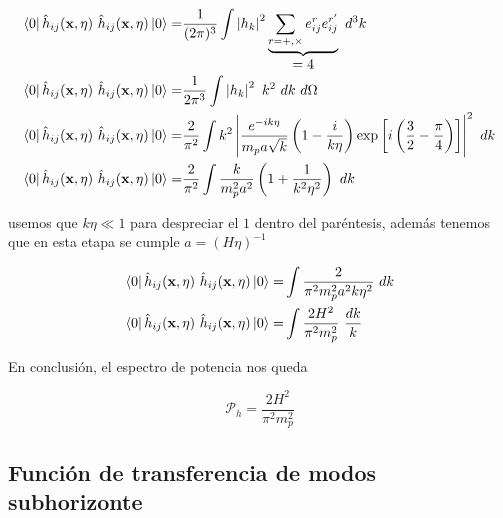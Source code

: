 \begin{equation*}
\begin{split}
        \bra{0} \hat{h}_{ij} (\textbf{x},\eta) \ \hat{h}_{ij} (\textbf{x}, \eta) \ket{0} =& \frac{1}{(2\pi)^3} \int \left| h_k \right|^2 \underbrace{\sum_{r = +, \times} e_{ij}^r e_{ij}^{r^\prime}}_{\displaystyle = 4} \ d^3 k\\
        \bra{0} \hat{h}_{ij} (\textbf{x},\eta) \ \hat{h}_{ij} (\textbf{x}, \eta) \ket{0} =& \frac{1}{2 \pi^3} \int \left| h_k \right|^2 \ k^2 \ dk \ d\Omega\\
        \bra{0} \hat{h}_{ij} (\textbf{x},\eta) \ \hat{h}_{ij} (\textbf{x}, \eta) \ket{0} =& \frac{2}{\pi^2} \int k^2 \left| \frac{e^{-ik\eta}}{m_p a \sqrt{k}} \left( 1 - \frac{i}{k \eta} \right) \exp \left[ i \left(\frac{3}{2} - \frac{\pi}{4} \right) \right] \right|^2 \ d k\\
        \bra{0} \hat{h}_{ij} (\textbf{x},\eta) \ \hat{h}_{ij} (\textbf{x}, \eta) \ket{0} =& \frac{2}{\pi^2} \int \frac{k}{m_p^2 a^2} \left( 1 + \frac{1}{k^2 \eta^2} \right) \ dk
    \end{split}
\end{equation*}

\noindent
usemos que $k \eta \ll 1$ para despreciar el $1$ dentro del paréntesis, además tenemos que en esta etapa se cumple $a = (H \eta)^{-1}$

\begin{equation*}
    \begin{split}
        \bra{0} \hat{h}_{ij} (\textbf{x},\eta) \ \hat{h}_{ij} (\textbf{x}, \eta) \ket{0} =& \int \frac{2}{\pi^2 m_p^2 a^2 k \eta^2} \ dk\\
        \bra{0} \hat{h}_{ij} (\textbf{x},\eta) \ \hat{h}_{ij} (\textbf{x}, \eta) \ket{0} =& \int \frac{2 H^2}{\pi^2 m_p^2} \ \frac{dk}{k}
    \end{split}
\end{equation*}

En conclusión, el espectro de potencia nos queda

\begin{equation}
    \mathcal{P}_h = \frac{2 H^2}{\pi^2 m_p^2}
\end{equation}

\subsection{Función de transferencia de modos subhorizonte}

